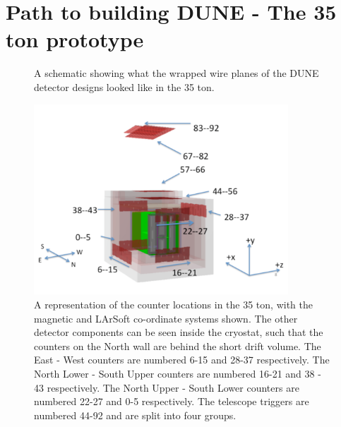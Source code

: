 \section{Path to building DUNE - The 35 ton prototype} \label{sec:The35tonDetector}  %

\begin{figure}[h]
  \centering
  \caption[The wrapped wires of the 35 ton]{A schematic showing what the wrapped wire planes of the DUNE detector designs looked like in the 35 ton.}
  \label{fig:35tonWireGeom}
\end{figure}

\begin{figure}[h]
  \centering
  \includegraphics[width=0.85\textwidth]{35tonFullDetect}
  \caption[A representation of the counter locations in the 35 ton]
          {A representation of the counter locations in the 35 ton, with the magnetic and LArSoft co-ordinate systems shown. The other detector components can be seen inside the cryostat, such that the counters on the North wall are behind the short drift volume. The East - West counters are numbered 6-15 and 28-37 respectively. The North Lower - South Upper counters are numbered 16-21 and 38 - 43 respectively. The North Upper - South Lower counters are numbered 22-27 and 0-5 respectively. The telescope triggers are numbered 44-92 and are split into four groups.}
  \label{fig:35tonCounterLoc}
\end{figure}


